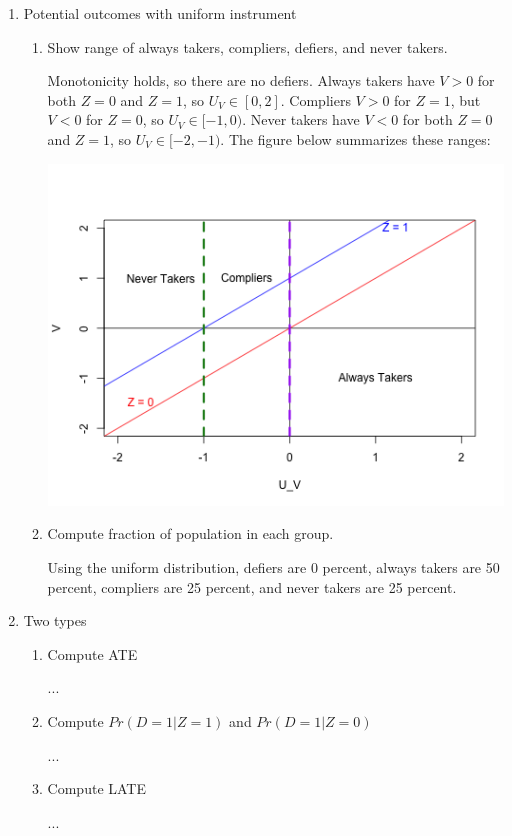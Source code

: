 \documentclass{article}
\begin{document}
\begin{enumerate}
\begin{enumerate}
\end{enumerate}

\item Potential outcomes with uniform instrument

\begin{enumerate}

\item Show range of always takers, compliers, defiers, and never takers.

Monotonicity holds, so there are no defiers. Always takers have $V > 0$ for both $Z = 0$ and $Z = 1$, so $U_V \in [0, 2]$. Compliers $V > 0$ for $Z = 1$, but $V < 0$ for $Z = 0$, so $U_V \in [-1, 0)$. Never takers have $V < 0$ for both $Z = 0$ and $Z =1$, so $U_V \in [-2, -1)$. The figure below summarizes these ranges:

\begin{center}
\includegraphics[scale = 0.8]{p1_q3_a}
\end{center}

\item Compute fraction of population in each group.

Using the uniform distribution, defiers are 0 percent, always takers are 50 percent, compliers are 25 percent, and never takers are 25 percent.

\end{enumerate}

\item Two types

\begin{enumerate}

\item Compute ATE

...

\item Compute $Pr(D=1 | Z = 1)$ and $Pr(D=1 | Z = 0)$

...

\item Compute LATE

...

\end{enumerate}

\end{enumerate}
\end{document}
